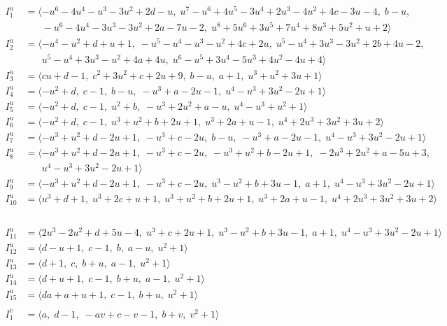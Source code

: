 \documentclass[1p]{elsarticle_modified}
\theoremstyle{definition}
\begin{document}
\begin{align*}
I^u_{1}&=\langle 
- u^6-4 u^4- u^3-3 u^2+2 d- u,\;u^7- u^6+4 u^5-3 u^4+2 u^3-4 u^2+4 c-3 u-4,\;b- u,\\
\phantom{I^u_{1}}&\phantom{= \langle  }- u^6-4 u^4-3 u^3-3 u^2+2 a-7 u-2,\;u^8+5 u^6+3 u^5+7 u^4+8 u^3+5 u^2+u+2\rangle \\
I^u_{2}&=\langle 
- u^4- u^2+d+u+1,\;- u^5- u^4- u^3- u^2+4 c+2 u,\;u^5- u^4+3 u^3-3 u^2+2 b+4 u-2,\\
\phantom{I^u_{2}}&\phantom{= \langle  }u^5- u^4+3 u^3- u^2+4 a+4 u,\;u^6- u^5+3 u^4-5 u^3+4 u^2-4 u+4\rangle \\
I^u_{3}&=\langle 
c u+d-1,\;c^2+3 u^2+c+2 u+9,\;b- u,\;a+1,\;u^3+u^2+3 u+1\rangle \\
I^u_{4}&=\langle 
- u^2+d,\;c-1,\;b- u,\;- u^3+a-2 u-1,\;u^4- u^3+3 u^2-2 u+1\rangle \\
I^u_{5}&=\langle 
- u^2+d,\;c-1,\;u^2+b,\;- u^3+2 u^2+a- u,\;u^4- u^3+u^2+1\rangle \\
I^u_{6}&=\langle 
- u^2+d,\;c-1,\;u^3+u^2+b+2 u+1,\;u^3+2 a+u-1,\;u^4+2 u^3+3 u^2+3 u+2\rangle \\
I^u_{7}&=\langle 
- u^3+u^2+d-2 u+1,\;- u^3+c-2 u,\;b- u,\;- u^3+a-2 u-1,\;u^4- u^3+3 u^2-2 u+1\rangle \\
I^u_{8}&=\langle 
- u^3+u^2+d-2 u+1,\;- u^3+c-2 u,\;- u^3+u^2+b-2 u+1,\;-2 u^3+2 u^2+a-5 u+3,\\
\phantom{I^u_{8}}&\phantom{= \langle  }u^4- u^3+3 u^2-2 u+1\rangle \\
I^u_{9}&=\langle 
- u^3+u^2+d-2 u+1,\;- u^3+c-2 u,\;u^3- u^2+b+3 u-1,\;a+1,\;u^4- u^3+3 u^2-2 u+1\rangle \\
I^u_{10}&=\langle 
u^3+d+1,\;u^3+2 c+u+1,\;u^3+u^2+b+2 u+1,\;u^3+2 a+u-1,\;u^4+2 u^3+3 u^2+3 u+2\rangle \\
\end{align*}\\
\begin{align*}
I^u_{11}&=\langle 
2 u^3-2 u^2+d+5 u-4,\;u^3+c+2 u+1,\;u^3- u^2+b+3 u-1,\;a+1,\;u^4- u^3+3 u^2-2 u+1\rangle \\
I^u_{12}&=\langle 
d- u+1,\;c-1,\;b,\;a- u,\;u^2+1\rangle \\
I^u_{13}&=\langle 
d+1,\;c,\;b+u,\;a-1,\;u^2+1\rangle \\
I^u_{14}&=\langle 
d+u+1,\;c-1,\;b+u,\;a-1,\;u^2+1\rangle \\
I^u_{15}&=\langle 
d a+a+u+1,\;c-1,\;b+u,\;u^2+1\rangle \\
\\
I^v_{1}&=\langle 
a,\;d-1,\;- a v+c- v-1,\;b+v,\;v^2+1\rangle \\
\end{align*}
\end{document}
